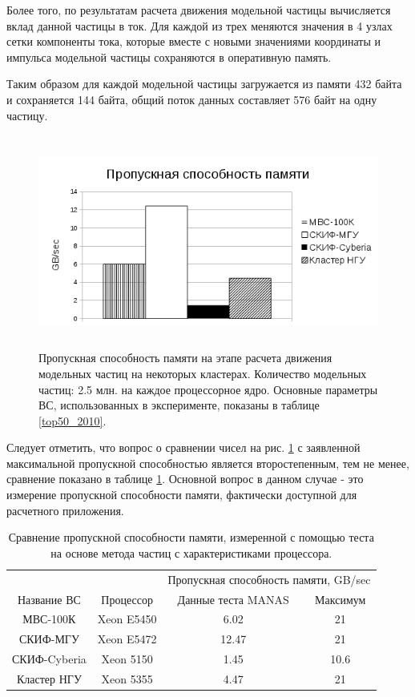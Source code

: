 Более того, по результатам расчета движения модельной частицы вычисляется вклад данной частицы в ток. Для каждой из трех меняются значения в 4 узлах сетки компоненты тока, которые вместе с новыми значениями координаты и импульса модельной частицы сохраняются в оперативную память.

Таким образом для каждой модельной частицы загружается из памяти 432 байта и сохраняется 144 байта, общий поток данных составляет 576 байт на одну частицу.




\begin{figure}[htb]
	\begin{center}
		\includegraphics[height=7cm,keepaspectratio]{images/data_proc_throughput_GBsec.png}
	\end{center}
	\caption{Пропускная способность памяти на этапе расчета движения модельных частиц на некоторых кластерах. Количество модельных частиц: 2.5 млн. на каждое процессорное ядро. Основные параметры ВС, использованных в эксперименте, показаны в таблице \ref{top50_2010}.}
	\label{PIC_RAM}
\end{figure}
Следует отметить, что вопрос о сравнении чисел на рис. \ref{PIC_RAM} с заявленной максимальной пропускной способностью 
является второстепенным, тем не менее, сравнение показано в таблице \ref{PIC_vs_PROC_RAM}. Основной вопрос в данном случае - это измерение пропускной способности памяти,  фактически доступной для расчетного приложения.

\begin{table}[ht]
\caption{Сравнение пропускной способности памяти, измеренной с помощью теста на основе метода частиц с характеристиками процессора.}
\label{PIC_vs_PROC_RAM}
\begin{tabular}{|c|c|c|c|}
	\hline
             &            & \multicolumn{2}{|c|}{Пропускная способность памяти, GB/sec} \\ \cline{3-4}  	
Название ВС  & Процессор  & Данные теста MANAS & Максимум \\ \hline
МВС-100К     & Xeon E5450 &     6.02           & 21       \\ \hline 
СКИФ-МГУ     & Xeon E5472 &     12.47          & 21       \\ \hline     
СКИФ-Cyberia & Xeon 5150  &     1.45           & 10.6     \\ \hline
Кластер НГУ  & Xeon 5355  &     4.47           & 21       \\ \hline
\end{tabular}	
\end{table}

